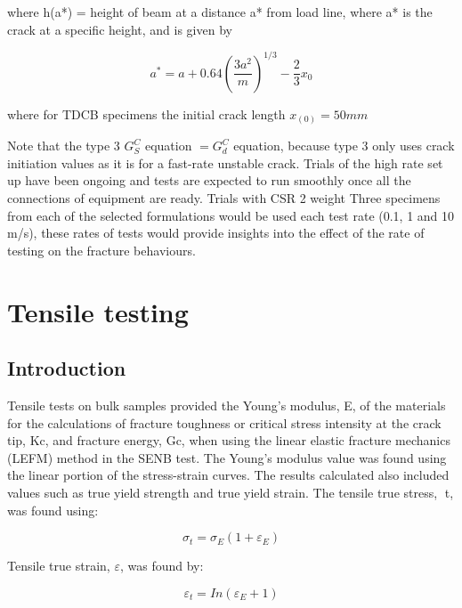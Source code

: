\documentclass[numbers=noendperiod,chapterprefix=on]{icldt} %
\begin{document}
where h(a*) = height of beam at a distance a* from load line, where a* is the crack at a specific height, and is given by

\begin{equation} 
a^\ast=a+0.64 \left( \frac{3a^2}{m}\right) ^{1/3}-\frac{2}{3}x_0
\end{equation}

where for TDCB specimens the initial crack length $x_{(0)}= 50mm$ 

Note that the type 3 $ G_S^C$ equation $ = G_d^C$ equation, because type 3 only uses crack initiation values as it is for a fast-rate unstable crack. 
Trials of the high rate set up have been ongoing and tests are expected to run smoothly once all the connections of equipment are ready. Trials with CSR 2 weight %
Three specimens from each of the selected formulations would be used each test rate (0.1, 1 and 10 m/s), these rates of tests would provide insights into the effect of the rate of testing on the fracture behaviours.

\section{Tensile testing}
\subsection{Introduction}
Tensile tests on bulk samples provided the Young’s modulus, E, of the materials for the calculations of fracture toughness or critical stress intensity at the crack tip, Kc, and fracture energy, Gc, when using the linear elastic fracture mechanics (LEFM) method in the SENB test. The Young’s modulus value was found using the linear portion of the stress-strain curves. The results calculated also included values such as true yield strength and true yield strain. 
The tensile true stress, t, was found using: 

\begin{equation} 
\sigma_t= \sigma_E (1+\varepsilon_E)
\end{equation}

Tensile true strain, $\varepsilon$, was found by:

\begin{equation} 
\varepsilon_t=In(\varepsilon_E+1)
\end{equation}
\end{document}
